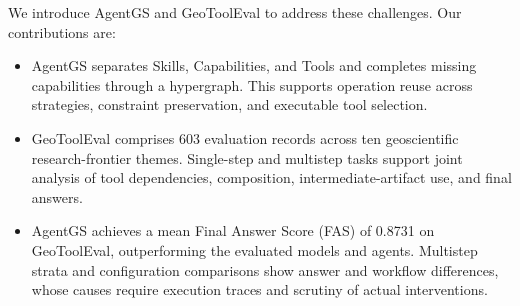 We introduce AgentGS and GeoToolEval to address these challenges. Our contributions are:
\begin{itemize}
\item AgentGS separates Skills, Capabilities, and Tools and completes missing capabilities through a hypergraph. This supports operation reuse across strategies, constraint preservation, and executable tool selection.
\item GeoToolEval comprises 603 evaluation records across ten geoscientific research-frontier themes. Single-step and multistep tasks support joint analysis of tool dependencies, composition, intermediate-artifact use, and final answers.
\item AgentGS achieves a mean Final Answer Score (FAS) of 0.8731 on GeoToolEval, outperforming the evaluated models and agents. Multistep strata and configuration comparisons show answer and workflow differences, whose causes require execution traces and scrutiny of actual interventions.
\end{itemize}
